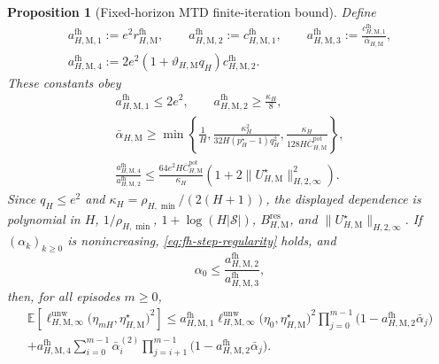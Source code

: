 \documentclass{article}
\newtheorem{proposition}[theorem]{Proposition}
\newcommand{\X}{\mathcal{S}}
\begin{document}
\begin{proposition}[Fixed-horizon MTD finite-iteration bound]
\label{prop:fh-mtd-abstract}
Define
\begin{equation}
\begin{gathered}
a_{H,\mathrm M,1}^{\mathrm{fh}}:=e^2r_{H,\mathrm M}^{\mathrm{fh}},\qquad
a_{H,\mathrm M,2}^{\mathrm{fh}}:=c_{H,\mathrm M,1}^{\mathrm{fh}},\qquad
a_{H,\mathrm M,3}^{\mathrm{fh}}:=\frac{c_{H,\mathrm M,1}^{\mathrm{fh}}}{\bar\alpha_{H,\mathrm M}},\\
a_{H,\mathrm M,4}^{\mathrm{fh}}:=2e^2(1+\vartheta_{H,\mathrm M}q_H)c_{H,\mathrm M,2}^{\mathrm{fh}}.
\end{gathered}
\end{equation}
These constants obey
\begin{equation}
\begin{gathered}
a_{H,\mathrm M,1}^{\mathrm{fh}}\le2e^2,\qquad
a_{H,\mathrm M,2}^{\mathrm{fh}}\ge\frac{\kappa_H}{8},\\
\bar\alpha_{H,\mathrm M}\ge\min\left\{\frac{1}{H},\frac{\kappa_H^2}{32H(p_H^\star-1)q_H^2},\frac{\kappa_H}{128H\overline C_{H,\mathrm M}^{\mathrm{pot}}}\right\},\\
\frac{a_{H,\mathrm M,4}^{\mathrm{fh}}}{a_{H,\mathrm M,2}^{\mathrm{fh}}}\le\frac{64e^2H\overline C_{H,\mathrm M}^{\mathrm{pot}}}{\kappa_H}\left(1+2\lVert U_{H,\mathrm M}^\star\rVert_{H,2,\infty}^2\right).
\end{gathered}
\end{equation}
Since $q_H\le e^2$ and $\kappa_H=\rho_{H,\min}/(2(H+1))$, the displayed dependence is polynomial in $H$, $1/\rho_{H,\min}$, $1+\log(H\lvert\X\rvert)$, $B_{H,\mathrm M}^{\mathrm{res}}$, and $\lVert U_{H,\mathrm M}^\star\rVert_{H,2,\infty}$. If $(\alpha_k)_{k\ge0}$ is nonincreasing, \eqref{eq:fh-step-regularity} holds, and
\begin{equation}
\alpha_0\le\frac{a_{H,\mathrm M,2}^{\mathrm{fh}}}{a_{H,\mathrm M,3}^{\mathrm{fh}}},
\end{equation}
then, for all episodes $m\ge0$,
\begin{equation}
\begin{gathered}
\mathbb E\left[\ell_{H,\mathrm M,\infty}^{\mathrm{unw}}\bigl(\eta_{mH},\eta_{H,\mathrm M}^\star\bigr)^2\right]\le
a_{H,\mathrm M,1}^{\mathrm{fh}}\ell_{H,\mathrm M,\infty}^{\mathrm{unw}}\bigl(\eta_0,\eta_{H,\mathrm M}^\star\bigr)^2
\prod_{j=0}^{m-1}\bigl(1-a_{H,\mathrm M,2}^{\mathrm{fh}}\bar\alpha_j\bigr)\\
+a_{H,\mathrm M,4}^{\mathrm{fh}}\sum_{i=0}^{m-1}\bar\alpha_i^{(2)}
\prod_{j=i+1}^{m-1}\bigl(1-a_{H,\mathrm M,2}^{\mathrm{fh}}\bar\alpha_j\bigr).
\end{gathered}
\end{equation}
\end{proposition}
\end{document}
